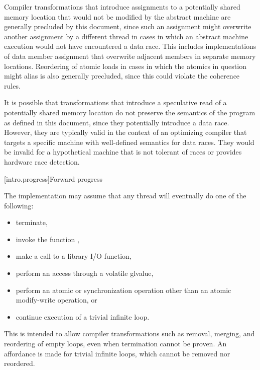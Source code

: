 \pnum
\begin{note}
Compiler transformations that introduce assignments to a potentially
shared memory location that would not be modified by the abstract machine are
generally precluded by this document, since such an assignment might overwrite
another assignment by a different thread in cases in which an abstract machine
execution would not have encountered a data race. This includes implementations
of data member assignment that overwrite adjacent members in separate memory
locations. Reordering of atomic loads in cases in which the atomics in question
might alias is also generally precluded, since this could violate the coherence
rules.
\end{note}

\pnum
\begin{note}
It is possible that transformations that introduce a speculative read of a potentially
shared memory location do not preserve the semantics of the \Cpp{} program as
defined in this document, since they potentially introduce a data race. However,
they are typically valid in the context of an optimizing compiler that targets a
specific machine with well-defined semantics for data races. They would be
invalid for a hypothetical machine that is not tolerant of races or provides
hardware race detection.
\end{note}

[intro.progress]{Forward progress}

\pnum
The implementation may assume that any thread will eventually do one of the
following:
\begin{itemize}
\item terminate,
\item invoke the function ,
\item make a call to a library I/O function,
\item perform an access through a volatile glvalue,
\item perform an atomic or synchronization operation
other than an atomic modify-write operation, or
\item continue execution of a trivial infinite loop.
\end{itemize}
\begin{note}
This is intended to allow compiler transformations
such as removal, merging, and reordering of empty loops,
even when termination cannot be proven.
An affordance is made for trivial infinite loops,
which cannot be removed nor reordered.
\end{note}

